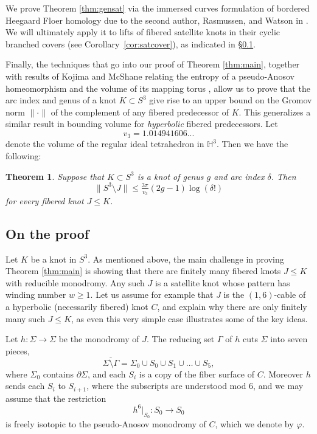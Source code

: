 \documentclass[11pt]{amsart}
\newtheorem {theorem}{Theorem}
\numberwithin{equation}{section}
\numberwithin{theorem}{section}
\theoremstyle{definition}
\begin{document}
We prove Theorem \ref{thm:gensat} via the immersed curves formulation of bordered Heegaard Floer homology due to the second author, Rasmussen, and Watson in \cite{hrw}. We will ultimately apply it to lifts of fibered satellite knots in their cyclic branched covers (see Corollary~\ref{cor:satcover}), as indicated in \S\ref{ssec:proof}.

Finally, the techniques that go into our proof of Theorem \ref{thm:main}, together with results of Kojima and McShane relating the entropy of a pseudo-Anosov homeomorphism and the volume of its mapping torus \cite{kojima-mcshane}, allow us to prove that the arc index and genus of a knot $K\subset S^3$ give rise to an upper bound on the Gromov norm $\lVert \cdot \rVert$ of the complement of any fibered predecessor of $K$. This generalizes a similar result in \cite[Theorem 1.4]{bs-ribbon} bounding volume for \emph{hyperbolic} fibered predecessors. Let \[v_3= 1.014941606...\] denote the volume of the regular ideal tetrahedron in $\mathbb{H}^3$. Then we have the following:


\begin{theorem}\label{thm:volume}
Suppose that $K\subset S^3$ is a knot of genus $g$ and arc index $\delta$. Then \[\lVert S^3\setminus J\rVert \leq \tfrac{3\pi}{v_3}(2g-1)\log(\delta!)\] for every fibered knot $J\leq K$.
\end{theorem} 


\subsection{On the proof}\label{ssec:proof}

Let $K$ be a knot in $S^3$. As mentioned above, the main challenge in proving Theorem \ref{thm:main} is showing that there are finitely many fibered knots $J\leq K$ with reducible monodromy. Any such $J$ is a satellite knot whose pattern has winding number $w\geq 1$. Let us assume for example that $J$ is the $(1,6)$-cable of a hyperbolic (necessarily fibered) knot $C$, and explain why there are only finitely many such $J\leq K$, as even this very simple case illustrates some of the key ideas.

Let $h:\Sigma\to \Sigma$ be the monodromy of $J$.  The reducing set $\Gamma$ of $h$ cuts $\Sigma$ into seven pieces, \[\overline{\Sigma \setminus \Gamma}  = \Sigma_0 \cup S_0 \cup S_1 \cup \dots \cup S_5,\] where $\Sigma_0$ contains $\partial \Sigma$, and each $S_i$ is a copy of the fiber surface of $C$. Moreover $h$ sends each $S_i$ to $S_{i+1}$, where the subscripts are understood mod 6, and we may assume that the restriction \[h^6|_{S_0}:S_0\to S_0\] is freely isotopic to the pseudo-Anosov monodromy of $C$, which we denote by $\varphi$.
\end{document}
